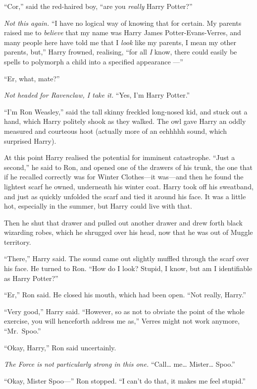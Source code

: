 ``Cor,'' said the red-haired boy, ``are you \emph{really} Harry
Potter?''

\emph{Not this again.} ``I have no logical way of knowing that for
certain. My parents raised me to \emph{believe} that my name was Harry
James Potter-Evans-Verres, and many people here have told me that I
\emph{look} like my parents, I mean my other parents, but,'' Harry
frowned, realising, ``for all \emph{I} know, there could easily be
spells to polymorph a child into a specified appearance ---''

``Er, what, mate?''

\emph{Not headed for Ravenclaw, I take it.} ``Yes, I'm Harry Potter.''

``I'm Ron Weasley,'' said the tall skinny freckled long-nosed kid, and
stuck out a hand, which Harry politely shook as they walked. The owl
gave Harry an oddly measured and courteous hoot (actually more of an
eehhhhh sound, which surprised Harry).

At this point Harry realised the potential for imminent catastrophe.
``Just a second,'' he said to Ron, and opened one of the drawers of his
trunk, the one that if he recalled correctly was for Winter Clothes---it
was---and then he found the lightest scarf he owned, underneath his
winter coat. Harry took off his sweatband, and just as quickly unfolded
the scarf and tied it around his face. It was a little hot, especially
in the summer, but Harry could live with that.

Then he shut that drawer and pulled out another drawer and drew forth
black wizarding robes, which he shrugged over his head, now that he was
out of Muggle territory.

``There,'' Harry said. The sound came out slightly muffled through the
scarf over his face. He turned to Ron. ``How do I look? Stupid, I know,
but am I identifiable as Harry Potter?''

``Er,'' Ron said. He closed his mouth, which had been open. ``Not
really, Harry.''

``Very good,'' Harry said. ``However, so as not to obviate the point of
the whole exercise, you will henceforth address me as,'' Verres might
not work anymore, ``Mr.~Spoo.''

``Okay, Harry,'' Ron said uncertainly.

\emph{The Force is not particularly strong in this one.} ``Call\ldots{}
me\ldots{} Mister\ldots{} Spoo.''

``Okay, Mister Spoo---'' Ron stopped. ``I can't do that, it makes me
feel stupid.''

